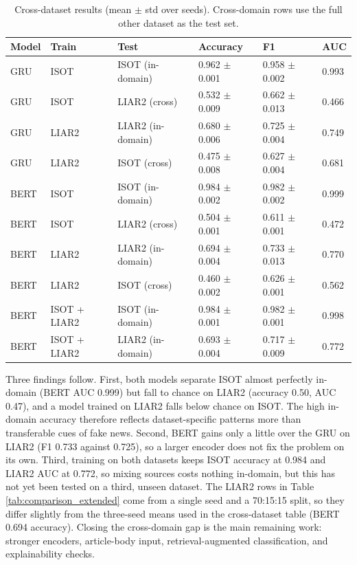 \documentclass[runningheads]{llncs}
\begin{document}
\begin{table}[htbp]
\centering
\caption{Cross-dataset results (mean $\pm$ std over seeds). Cross-domain rows use the full other dataset as the test set.}
\label{tab:cross-dataset}
\begin{tabular}{llllll}
\hline
Model & Train & Test & Accuracy & F1 & AUC \\
\hline
GRU & ISOT & ISOT (in-domain) & 0.962 $\pm$ 0.001 & 0.958 $\pm$ 0.002 & 0.993 \\
GRU & ISOT & LIAR2 (cross) & 0.532 $\pm$ 0.009 & 0.662 $\pm$ 0.013 & 0.466 \\
GRU & LIAR2 & LIAR2 (in-domain) & 0.680 $\pm$ 0.006 & 0.725 $\pm$ 0.004 & 0.749 \\
GRU & LIAR2 & ISOT (cross) & 0.475 $\pm$ 0.008 & 0.627 $\pm$ 0.004 & 0.681 \\
BERT & ISOT & ISOT (in-domain) & 0.984 $\pm$ 0.002 & 0.982 $\pm$ 0.002 & 0.999 \\
BERT & ISOT & LIAR2 (cross) & 0.504 $\pm$ 0.001 & 0.611 $\pm$ 0.001 & 0.472 \\
BERT & LIAR2 & LIAR2 (in-domain) & 0.694 $\pm$ 0.004 & 0.733 $\pm$ 0.013 & 0.770 \\
BERT & LIAR2 & ISOT (cross) & 0.460 $\pm$ 0.002 & 0.626 $\pm$ 0.001 & 0.562 \\
BERT & ISOT + LIAR2 & ISOT (in-domain) & 0.984 $\pm$ 0.001 & 0.982 $\pm$ 0.001 & 0.998 \\
BERT & ISOT + LIAR2 & LIAR2 (in-domain) & 0.693 $\pm$ 0.004 & 0.717 $\pm$ 0.009 & 0.772 \\
\hline
\end{tabular}
\end{table}

Three findings follow. First, both models separate ISOT almost perfectly in-domain (BERT AUC 0.999) but fall to chance on LIAR2 (accuracy 0.50, AUC 0.47), and a model trained on LIAR2 falls below chance on ISOT. The high in-domain accuracy therefore reflects dataset-specific patterns more than transferable cues of fake news. Second, BERT gains only a little over the GRU on LIAR2 (F1 0.733 against 0.725), so a larger encoder does not fix the problem on its own. Third, training on both datasets keeps ISOT accuracy at 0.984 and LIAR2 AUC at 0.772, so mixing sources costs nothing in-domain, but this has not yet been tested on a third, unseen dataset. The LIAR2 rows in Table \ref{tab:comparison_extended} come from a single seed and a 70:15:15 split, so they differ slightly from the three-seed means used in the cross-dataset table (BERT 0.694 accuracy). Closing the cross-domain gap is the main remaining work: stronger encoders, article-body input, retrieval-augmented classification, and explainability checks.
\end{document}
